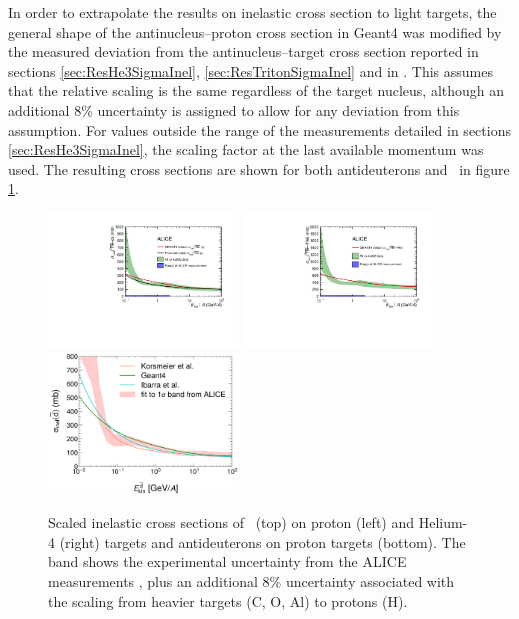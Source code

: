 In order to extrapolate the results on inelastic cross section to light targets, the general shape of the antinucleus--proton cross section in Geant4 was modified by the measured deviation from the antinucleus--target cross section reported in sections \ref{sec:ResHe3SigmaInel}, \ref{sec:ResTritonSigmaInel} and in \cite{}. This assumes that the relative scaling is the same regardless of the target nucleus, although an additional 8\% uncertainty is assigned to allow for any deviation from this assumption. For values outside the range of the measurements detailed in sections \ref{sec:ResHe3SigmaInel}, the scaling factor at the last available momentum was used.
The resulting cross sections are shown for both antideuterons and \ahe\ in figure \ref{fig:ScaledXS_ahe_adeut}. 

\begin{figure}[hbtp]
    \centering
    \includegraphics[width=0.45\textwidth]{figures/Antihelum_on_p_targets_scaled_with_paramterisation.pdf}
    \includegraphics[width=0.45\textwidth]{figures/Antihelum_on_p_targets_scaled.pdf}
    \includegraphics[width=0.45\textwidth]{figures/dbar_xs_comparison_dbarNotInLabels.png}
    \caption{Scaled inelastic cross sections of \ahe\ (top) on proton (left) and Helium-4 (right) targets and antideuterons on proton targets (bottom). The band shows the experimental uncertainty from the ALICE measurements \cite{}, plus an additional 8\% uncertainty associated with the scaling from heavier targets (C, O, Al) to protons (H).}
    \label{fig:ScaledXS_ahe_adeut}
\end{figure}

